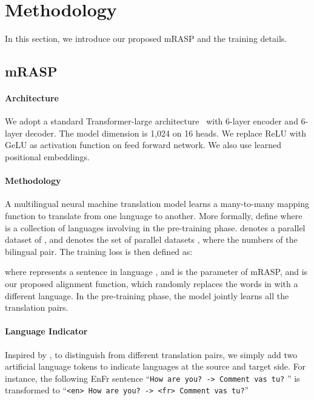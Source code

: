 \documentclass[11pt,a4paper]{article}
\newcommand{\method}{mRASP\xspace}
\begin{document}
\section{Methodology}
\label{sec:approach}

In this section, we introduce our proposed \method and the training details.




\subsection{\method}

\paragraph{Architecture}
We adopt a standard Transformer-large architecture~\cite{DBLP:conf/nips/VaswaniSPUJGKP17} with 6-layer encoder and 6-layer decoder. 
The model dimension is 1,024 on 16 heads. 
We replace ReLU with GeLU \cite{DBLP:journals/corr/HendrycksG16} as activation function on feed forward network. 
We also use learned positional embeddings.

\paragraph{Methodology}
A multilingual neural machine translation model learns a many-to-many mapping function  to translate from one language to another. More formally, define   where  is a collection of languages involving in the pre-training phase. 
 denotes a parallel dataset of , and  denotes the set of parallel datasets , where  the numbers of the bilingual pair. The training loss is then defined as:

where  represents a sentence in language , and  is the parameter of \method, and  is our proposed alignment function, which randomly replaces the words in  with a different language. 
In the pre-training phase, the model jointly learns all the translation pairs.


\paragraph{Language Indicator}
Inspired by \cite{DBLP:journals/tacl/JohnsonSLKWCTVW17, ha2016toward},  to distinguish from different translation pairs, we simply add two artificial language tokens to indicate languages at the source and target side. For instance, the following EnFr sentence  
``\texttt{How are you? -> Comment vas tu?} ''
is transformed to 
``\texttt{<en>  How are you? -> <fr> Comment vas tu?}''
\end{document}

